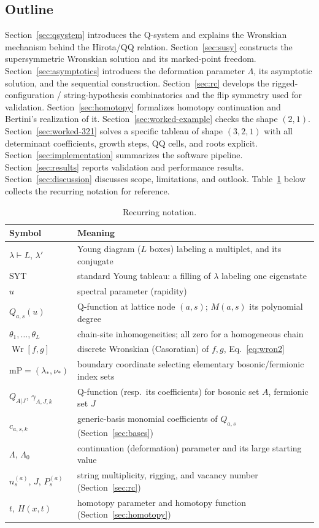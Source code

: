 \documentclass[11pt]{article}
\newcommand{\Wron}{\operatorname{Wr}}
\begin{document}
\subsection{Outline}

Section~\ref{sec:qsystem} introduces the Q-system and explains the
Wronskian mechanism behind the Hirota/QQ relation. Section~\ref{sec:susy}
constructs the supersymmetric Wronskian solution and its marked-point
freedom. Section~\ref{sec:asymptotics} introduces the deformation
parameter $\Lambda$, its asymptotic solution, and the sequential
construction. Section~\ref{sec:rc} develops the rigged-configuration /
string-hypothesis combinatorics and the flip symmetry used for
validation. Section~\ref{sec:homotopy} formalizes homotopy continuation
and Bertini's realization of it. Section~\ref{sec:worked-example} checks the shape $(2,1)$.
Section~\ref{sec:worked-321} solves a specific tableau of shape $(3,2,1)$
with all determinant coefficients, growth steps, QQ cells, and roots explicit.
Section~\ref{sec:implementation} summarizes the software pipeline.
Section~\ref{sec:results} reports validation and performance results.
Section~\ref{sec:discussion} discusses scope, limitations, and outlook.
Table~\ref{tab:notation} below collects the recurring notation for
reference.

\begin{table}[H]
\centering
\begin{tabular}{@{}ll@{}}
\toprule
\textbf{Symbol} & \textbf{Meaning} \\
\midrule
$\lambda\vdash L$, $\lambda'$ & Young diagram ($L$ boxes) labeling a multiplet, and its conjugate \\
$\mathrm{SYT}$ & standard Young tableau: a filling of $\lambda$ labeling one eigenstate \\
$u$ & spectral parameter (rapidity) \\
$Q_{a,s}(u)$ & Q-function at lattice node $(a,s)$; $M(a,s)$ its polynomial degree \\
$\theta_1,\dots,\theta_L$ & chain-site inhomogeneities; all zero for a homogeneous chain \\
$\Wron[f,g]$ & discrete Wronskian (Casoratian) of $f,g$, Eq.~\eqref{eq:wron2} \\
$\mathrm{mP}=(\lambda_\ast,\nu_\ast)$ & boundary coordinate selecting elementary bosonic/fermionic index sets \\
$Q_{A|J}$, $\gamma_{A,J,k}$ & Q-function (resp.\ its coefficients) for bosonic set $A$, fermionic set $J$ \\
$c_{a,s,k}$ & generic-basis monomial coefficients of $Q_{a,s}$ (Section~\ref{sec:bases}) \\
$\Lambda$, $\Lambda_0$ & continuation (deformation) parameter and its large starting value \\
$n^{(a)}_s$, $J$, $P^{(a)}_s$ & string multiplicity, rigging, and vacancy number (Section~\ref{sec:rc}) \\
$t$, $H(x,t)$ & homotopy parameter and homotopy function (Section~\ref{sec:homotopy}) \\
\bottomrule
\end{tabular}
\caption{Recurring notation.}
\label{tab:notation}
\end{table}
\end{document}
